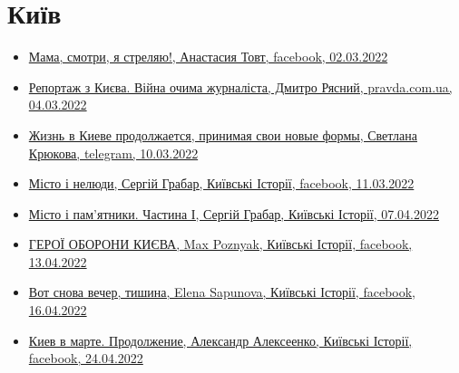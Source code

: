  
 
 
 
 

\section{Київ}
\label{sec:topics.vojna.kiev}


\begin{itemize} %
\item \hyperlink{02_03_2022.fb.tovt_anastasia.1.mama_smotri_ja_streljaju}{%
Мама, смотри, я стреляю!, Анастасия Товт, facebook, 02.03.2022%
}

\item \hyperlink{04_03_2022.stz.news.ua.pravda.1.reportazh_z_kieva}{%
Репортаж з Києва. Війна очима журналіста, Дмитро Рясний, pravda.com.ua, 04.03.2022%
}

\item \hyperlink{10_03_2022.tg.krjukova_svetlana.1.zhizn_v_kieve}{%
Жизнь в Киеве продолжается, принимая свои новые формы, Светлана Крюкова, telegram, 10.03.2022
}

\item \hyperlink{11_03_2022.fb.fb_group.story_kiev_ua.2.misto_i_neljudy}{%
Місто і нелюди, Сергій Грабар, Київські Історії, facebook, 11.03.2022%
}

\item \hyperlink{07_04_2022.fb.fb_group.story_kiev_ua.1.misto_i_pamjatnyky_chastyna_1}{%
Місто і пам'ятники. Частина І, Сергій Грабар, Київські Історії, 07.04.2022%
}

\item \hyperlink{13_04_2022.fb.fb_group.story_kiev_ua.1.geroi_oborony_kieva}{%
ГЕРОЇ ОБОРОНИ КИЄВА, Max Poznyak, Київські Історії, facebook, 13.04.2022%
}

\item \hyperlink{16_04_2022.fb.fb_group.story_kiev_ua.1.vecher_tishina}{%
Вот снова вечер, тишина, Elena Sapunova, Київські Історії, facebook, 16.04.2022%
}

\item \hyperlink{24_04_2022.fb.fb_group.story_kiev_ua.1.kiev_v_marte_prodolzhenie}{%
Киев в марте. Продолжение, Александр Алексеенко, Київські Історії, facebook, 24.04.2022%
}

\end{itemize} %
